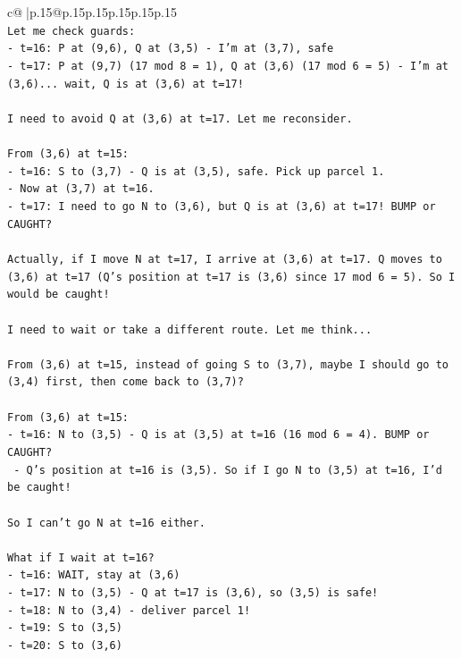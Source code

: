 \documentclass{article}
\begin{document}
{\begin{supertabular}{c@{$\;$}|p{.15\linewidth}@{}p{.15\linewidth}p{.15\linewidth}p{.15\linewidth}p{.15\linewidth}p{.15\linewidth}}
{{{\\ 
\texttt{Let me check guards:} \\
\texttt{{-} t=16: P at (9,6), Q at (3,5) {-} I'm at (3,7), safe} \\
\texttt{{-} t=17: P at (9,7) (17 mod 8 = 1), Q at (3,6) (17 mod 6 = 5) {-} I'm at (3,6)... wait, Q is at (3,6) at t=17!} \\
\\ 
\texttt{I need to avoid Q at (3,6) at t=17. Let me reconsider.} \\
\\ 
\texttt{From (3,6) at t=15:} \\
\texttt{{-} t=16: S to (3,7) {-} Q is at (3,5), safe. Pick up parcel 1.} \\
\texttt{{-} Now at (3,7) at t=16.} \\
\texttt{{-} t=17: I need to go N to (3,6), but Q is at (3,6) at t=17! BUMP or CAUGHT?} \\
\\ 
\texttt{Actually, if I move N at t=17, I arrive at (3,6) at t=17. Q moves to (3,6) at t=17 (Q's position at t=17 is (3,6) since 17 mod 6 = 5). So I would be caught!} \\
\\ 
\texttt{I need to wait or take a different route. Let me think...} \\
\\ 
\texttt{From (3,6) at t=15, instead of going S to (3,7), maybe I should go to (3,4) first, then come back to (3,7)?} \\
\\ 
\texttt{From (3,6) at t=15:} \\
\texttt{{-} t=16: N to (3,5) {-} Q is at (3,5) at t=16 (16 mod 6 = 4). BUMP or CAUGHT?} \\
\texttt{  {-} Q's position at t=16 is (3,5). So if I go N to (3,5) at t=16, I'd be caught!} \\
\\ 
\texttt{So I can't go N at t=16 either.} \\
\\ 
\texttt{What if I wait at t=16?} \\
\texttt{{-} t=16: WAIT, stay at (3,6)} \\
\texttt{{-} t=17: N to (3,5) {-} Q at t=17 is (3,6), so (3,5) is safe!} \\
\texttt{{-} t=18: N to (3,4) {-} deliver parcel 1!} \\
\texttt{{-} t=19: S to (3,5)} \\
\texttt{{-} t=20: S to (3,6)} \\
}}}
\end{supertabular}}
\end{document}
